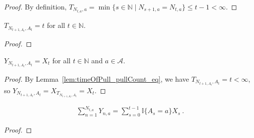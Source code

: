 \begin{proof}
By definition, $T_{N_{t,a}, a} = \min\{s \in \mathbb{N} \mid N_{s+1,a} = N_{t,a}\} \le t - 1 < \infty$.
\end{proof}


\begin{lemma}\label{lem:timeOfPull_pullCount_eq}
$T_{N_{t+1, A_t}, A_t} = t$ for all $t \in \mathbb{N}$.
\end{lemma}

\begin{proof}

\end{proof}


\begin{lemma}\label{lem:altReward_pullCount}
$Y_{N_{t+1,A_t}, A_t} = X_t$ for all $t \in \mathbb{N}$ and $a \in \mathcal{A}$.
\end{lemma}

\begin{proof}
By Lemma~\ref{lem:timeOfPull_pullCount_eq}, we have $T_{N_{t+1,A_t}, A_t} = t < \infty$, so $Y_{N_{t+1,A_t}, A_t} = X_{T_{N_{t+1,A_t}, A_t}} = X_t$.

\end{proof}


\begin{lemma}\label{lem:sum_altReward}
\begin{align*}
  \sum_{n=1}^{N_{t, a}} Y_{n, a} = \sum_{s=0}^{t-1} \mathbb{I}\{A_s = a\} X_s
  \: .
\end{align*}
\end{lemma}

\begin{proof}

\end{proof}
